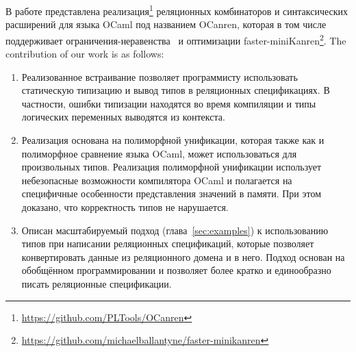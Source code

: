 В работе представлена реализация\footnote{\url{https://github.com/PLTools/OCanren}} реляционных комбинаторов и синтаксических расширений для языка OCaml под названием OCanren,
которая в том числе поддерживает ограничения-неравенства~\cite{CKanren} и  оптимизации faster-miniKanren\footnote{\url{https://github.com/michaelballantyne/faster-minikanren}}.
The contribution of our work is as follows:

\begin{enumerate}
\item Реализованное встраивание позволяет программисту использовать статическую типизацию и вывод типов в реляционных спецификациях. В частности, ошибки типизации находятся во время компиляции и типы логических переменных выводятся из контекста.

\item Реализация основана на полиморфной унификации, которая также как и полиморфное сравнение языка OCaml, может использоваться для произвольных типов.
Реализация полиморфной унификации использует небезопасные возможности компилятора OCaml и полагается на специфичные особенности представления значений в памяти.
При этом доказано, что корректность типов не нарушается.
\item Описан масштабируемый подход (глава~\ref{sec:examples}) к использованию типов при написании реляционных спецификаций, которые позволяет конвертировать данные из реляционного домена и в него. Подход основан на обобщённом программировании и позволяет более кратко и единообразно писать реляционные спецификации.



\end{enumerate}
